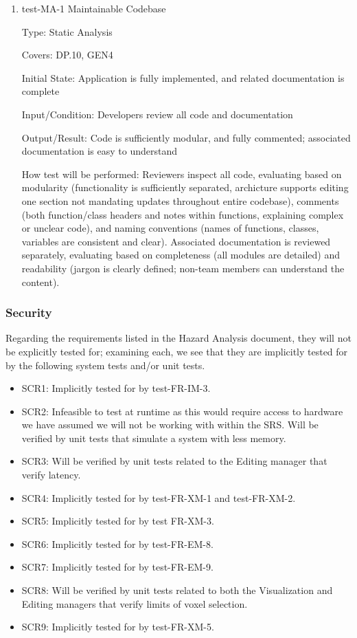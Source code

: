 \documentclass[12pt, titlepage]{article}
\begin{document}
\begin{enumerate}

\item{test-MA-1 Maintainable Codebase\\}

Type: Static Analysis

Covers: DP.10, GEN4 %
					
Initial State: Application is fully implemented, and related documentation is complete
					
Input/Condition: Developers review all code and documentation
					
Output/Result: Code is sufficiently modular, and fully commented; associated documentation is easy to understand
					
How test will be performed: Reviewers inspect all code, evaluating based on modularity (functionality is sufficiently separated,
archicture supports editing one section not mandating updates throughout entire codebase), comments (both function/class headers and notes 
within functions, explaining complex or unclear code), and naming conventions (names of functions, classes, variables are consistent
and clear). Associated documentation is reviewed separately, evaluating based on completeness (all modules are detailed) and readability
(jargon is clearly defined; non-team members can understand the content).

\end{enumerate}

\subsubsection{Security}

Regarding the requirements listed in the Hazard Analysis document, they will not be explicitly tested for; examining each, we see that they
are implicitly tested for by the following system tests and/or unit tests.

\begin{itemize}
  \item SCR1: Implicitly tested for by test-FR-IM-3.
  \item SCR2: Infeasible to test at runtime as this would require access to hardware we have assumed we will not be working with within the SRS.
  Will be verified by unit tests that simulate a system with less memory.
  \item SCR3: Will be verified by unit tests related to the Editing manager that verify latency.
  \item SCR4: Implicitly tested for by test-FR-XM-1 and test-FR-XM-2.
  \item SCR5: Implicitly tested for by test FR-XM-3.
  \item SCR6: Implicitly tested for by test-FR-EM-8.
  \item SCR7: Implicitly tested for by test-FR-EM-9.
  \item SCR8: Will be verified by unit tests related to both the Visualization and Editing managers that verify limits of voxel selection.
  \item SCR9: Implicitly tested for by test-FR-XM-5.
\end{itemize}
\end{document}

